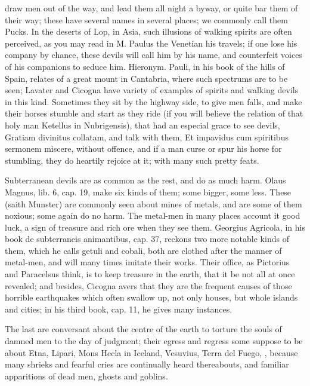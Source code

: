 {{draw men out of the way, and lead them all night a byway, or quite bar
them of their way; these have several names in several places; we
commonly call them Pucks. In the deserts of Lop, in Asia, such
illusions of walking spirits are often perceived, as you may read in M.
Paulus the Venetian his travels; if one lose his company by chance,
these devils will call him by his name, and counterfeit voices of his
companions to seduce him. Hieronym. Pauli, in his book of the hills of
Spain, relates of a great mount in Cantabria, where such
spectrums are to be seen; Lavater and Cicogna have variety of examples
of spirits and walking devils in this kind. Sometimes they sit by the
highway side, to give men falls, and make their horses stumble and
start as they ride (if you will believe the relation of that holy man
Ketellus in Nubrigensis), that had an especial grace to see
devils, Gratiam divinitus collatam, and talk with them, Et impavidus
cum spiritibus sermonem miscere, without offence, and if a man curse or
spur his horse for stumbling, they do heartily rejoice at it; with many
such pretty feats.

Subterranean devils are as common as the rest, and do as much harm.
Olaus Magnus, lib. 6, cap. 19, make six kinds of them; some bigger,
some less. These (saith Munster) are commonly seen about mines of
metals, and are some of them noxious; some again do no harm. The
metal-men in many places account it good luck, a sign of treasure and
rich ore when they see them. Georgius Agricola, in his book de
subterraneis animantibus, cap. 37, reckons two more notable kinds of
them, which he calls getuli and cobali, both are clothed after
the manner of metal-men, and will many times imitate their works. Their
office, as Pictorius and Paracelsus think, is to keep treasure in the
earth, that it be not all at once revealed; and besides, Cicogna
avers that they are the frequent causes of those horrible earthquakes
which often swallow up, not only houses, but whole islands and cities;
in his third book, cap. 11, he gives many instances.

The last are conversant about the centre of the earth to torture the
souls of damned men to the day of judgment; their egress and regress
some suppose to be about Etna, Lipari, Mons Hecla in Iceland, Vesuvius,
Terra del Fuego, \etc{}, because many shrieks and fearful cries are
continually heard thereabouts, and familiar apparitions of dead men,
ghosts and goblins.

}}
